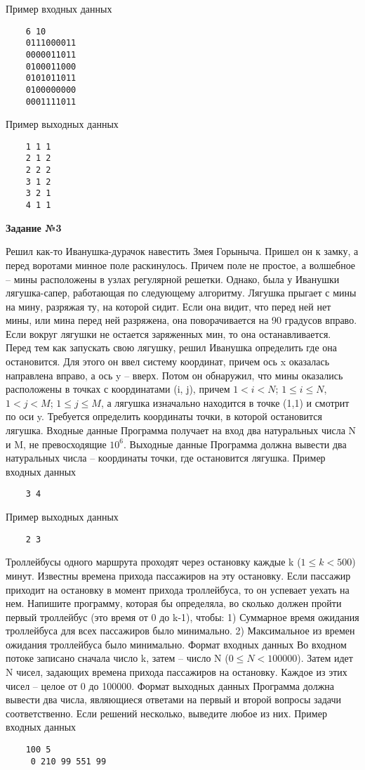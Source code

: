 Пример входных данных
\begin{verbatim}
    6 10
    0111000011
    0000011011
    0100011000
    0101011011
    0100000000
    0001111011
\end{verbatim}

Пример выходных данных
\begin{verbatim}
    1 1 1
    2 1 2
    2 2 2
    3 1 2
    3 2 1
    4 1 1
\end{verbatim}



{\bf Задание №3}

Решил как-то Иванушка-дурачок навестить Змея Горыныча. Пришел он к замку, а перед воротами минное поле раскинулось. Причем поле не простое, а волшебное – мины расположены в узлах регулярной решетки. 
Однако, была у Иванушки лягушка-сапер, работающая по следующему алгоритму. Лягушка прыгает с мины на мину, разряжая ту, на которой сидит. Если она видит, что перед ней нет мины, или мина перед ней разряжена, 
она поворачивается на 90 градусов вправо. Если вокруг лягушки не остается заряженных мин, то она останавливается. Перед тем как запускать свою лягушку, решил Иванушка определить где она остановится. 
Для этого он ввел систему координат, причем ось x оказалась направлена вправо, а ось y – вверх. Потом он обнаружил, что мины оказались расположены в точках с координатами (i, j), причем $1 < i < N$; $1 \le i \le N$, $1 < j < M$; $1 \le j \le M$, 
а лягушка изначально находится в точке (1,1) и смотрит по оси y. Требуется определить координаты точки, в которой остановится лягушка.
Входные данные
Программа получает на вход два натуральных числа N и M, не превосходящие $10^6$.
Выходные данные
Программа должна вывести два натуральных числа – координаты точки, где остановится лягушка.
Пример входных данных
\begin{verbatim}
    3 4
\end{verbatim}

Пример выходных данных
\begin{verbatim}
    2 3
\end{verbatim}



Троллейбусы одного маршрута проходят через остановку каждые k ($1 \le k<500$) минут. Известны времена прихода пассажиров на эту остановку. Если пассажир приходит на остановку в момент прихода троллейбуса, то он успевает уехать на нем.
Напишите программу, которая бы определяла, во сколько должен пройти первый троллейбус (это время от 0 до k-1), чтобы:
1) Суммарное время ожидания троллейбуса для всех пассажиров было минимально.
2) Максимальное из времен ожидания троллейбуса было минимально.
Формат входных данных
Во входном потоке записано сначала число k, затем – число N ($0 \le N < 100000$). Затем идет N чисел, задающих времена прихода пассажиров на остановку. Каждое из этих чисел – целое от 0 до 100000.
Формат выходных данных
Программа должна вывести два числа, являющиеся ответами на первый и второй вопросы задачи соответственно. Если решений несколько, выведите любое из них.
Пример входных данных
\begin{verbatim}
    100 5
     0 210 99 551 99
\end{verbatim}

